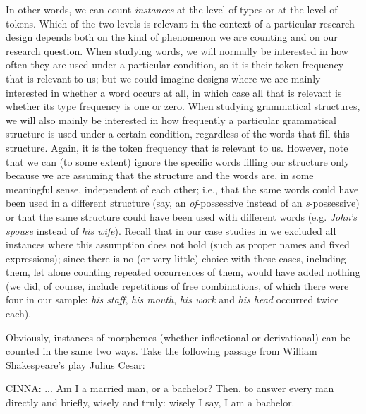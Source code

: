 In other words, we can count \textit{instances} at the level of types  or at the level of tokens.  Which of the two levels is relevant in the context of a particular research design  depends both on the kind of phenomenon we are counting and on our research question. When studying words, we will normally be interested in how often they are used under a particular condition, so it is their token  frequency  that is relevant to us; but we could imagine designs  where we are mainly interested in whether a word occurs at all, in which case all that is relevant is whether its type  frequency  is one or zero. When studying grammatical  structures, we will also mainly be interested in how frequently a particular grammatical structure is used under a certain condition, regardless of the words that fill this structure. Again, it is the token  frequency  that is relevant to us. However, note that we can (to some extent) ignore the specific words filling our structure only because we are assuming that the structure and the words are, in some meaningful sense, independent of each other; i.e., that the same words could have been used in a different structure (say, an \textit{of}-possessive  instead of an \textit{s}-possessive) or that the same structure could have been used with different words (e.g. \textit{John's spouse} instead of \textit{his wife}). Recall that in our case studies in  we excluded all instances where this assumption does not hold (such as proper names and fixed expressions); since there is no (or very little) choice with these cases, including them, let alone counting repeated occurrences of them, would have added nothing (we did, of course, include repetitions of free combinations, of which there were four in our sample: \textit{his staff}, \textit{his mouth}, \textit{his work} and \textit{his head} occurred twice each).

Obviously, instances of morphemes  (whether inflectional or derivational) can be counted in the same two ways. Take the following passage from William Shakespeare's play Julius Cesar:

\begin{exe}
\ex CINNA: ... Am I a married man, or a bachelor? Then, to answer every man directly and briefly, wisely and truly: wisely I say, I am a bachelor.
\label{ex:shakspearecinna}
\end{exe}

